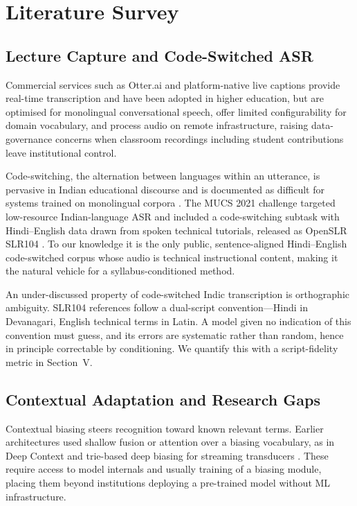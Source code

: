 \documentclass[conference]{IEEEtran}
\begin{document}
\section{Literature Survey}

\subsection{Lecture Capture and Code-Switched ASR}

Commercial services such as Otter.ai and platform-native live captions provide
real-time transcription and have been adopted in higher education, but are
optimised for monolingual conversational speech, offer limited configurability for
domain vocabulary, and process audio on remote infrastructure, raising
data-governance concerns when classroom recordings including student
contributions leave institutional control.

Code-switching, the alternation between languages within an utterance, is
pervasive in Indian educational discourse and is documented as difficult for
systems trained on monolingual corpora \cite{sitaram2019survey}. The MUCS 2021
challenge \cite{diwan2021mucs} targeted low-resource Indian-language ASR and
included a code-switching subtask with Hindi--English data drawn from spoken
technical tutorials, released as OpenSLR SLR104 \cite{openslr104}. To our
knowledge it is the only public, sentence-aligned Hindi--English code-switched
corpus whose audio is technical instructional content, making it the natural
vehicle for a syllabus-conditioned method.

An under-discussed property of code-switched Indic transcription is orthographic
ambiguity. SLR104 references follow a dual-script convention---Hindi in
Devanagari, English technical terms in Latin. A model given no indication of this
convention must guess, and its errors are systematic rather than random, hence in
principle correctable by conditioning. We quantify this with a script-fidelity
metric in Section~V.

\subsection{Contextual Adaptation and Research Gaps}

Contextual biasing steers recognition toward known relevant terms. Earlier
architectures used shallow fusion or attention over a biasing vocabulary, as in
Deep Context \cite{pundak2018deepcontext} and trie-based deep biasing for
streaming transducers \cite{le2021contextualized}. These require access to model
internals and usually training of a biasing module, placing them beyond
institutions deploying a pre-trained model without ML infrastructure.
\end{document}
